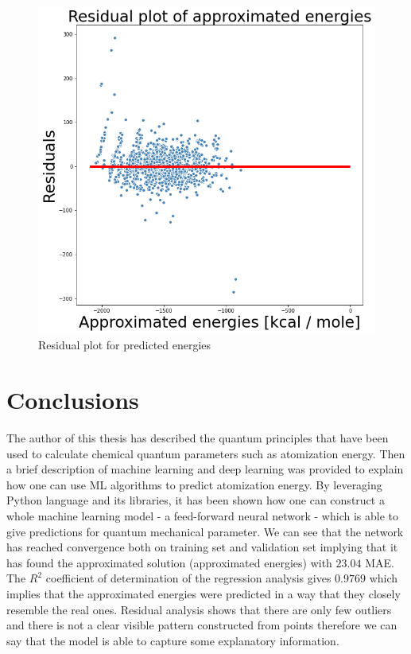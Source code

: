 \documentclass[a4paper,oneside,openright,11pt]{book}
\begin{document}
\begin{figure}[h!]
\centering
\includegraphics[scale=0.7]{DocumentFigures/ZdjeciaWalidacja/ResidualsTest.png}
\caption{Residual plot for predicted energies}
\end{figure}




\section{Conclusions}

The author of this thesis has described the quantum principles that have been used to calculate chemical quantum parameters such as atomization energy. Then a brief description of machine learning and deep learning was provided to explain how one can use ML algorithms to predict atomization energy. By leveraging Python language and its libraries, it has been shown how one can construct a whole machine learning model - a feed-forward neural network - which is able to give predictions for quantum mechanical parameter. We can see that the network has reached convergence both on training set and validation set implying that it has found the approximated solution (approximated energies) with $23.04$ MAE. The $R^2$ coefficient of determination of the regression analysis gives $0.9769$ which implies that the approximated energies were predicted in a way that they closely resemble the real ones. Residual analysis shows that there are only few outliers and there is not a clear visible pattern constructed from points therefore we can say that the model is able to capture some explanatory information.
\end{document}
